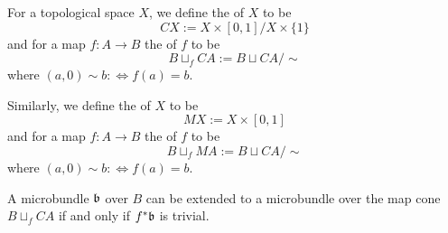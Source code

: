 
For a topological space $X$, we define the  of $X$ to be 
\[ CX := X \times [0, 1] / X \times \{1\} \]
and for a map $f: A \to B$ the  of $f$ to be
\[ B \sqcup_f CA := B \sqcup CA / \sim \]
where $(a, 0) \sim b :\iff f(a) = b$.

Similarly, we define the  of $X$ to be
\[ MX := X \times [0, 1] \]
and for a map $f: A \to B$ the  of $f$ to be
\[ B \sqcup_f MA := B \sqcup CA / \sim \]
where $(a, 0) \sim b :\iff f(a) = b$.

\begin{mylemma}
A microbundle $\mathfrak{b}$ over $B$ can be extended to a microbundle over the map cone $B \sqcup_f CA$ if and only if $f^*\mathfrak{b}$ is trivial.
\end{mylemma}
